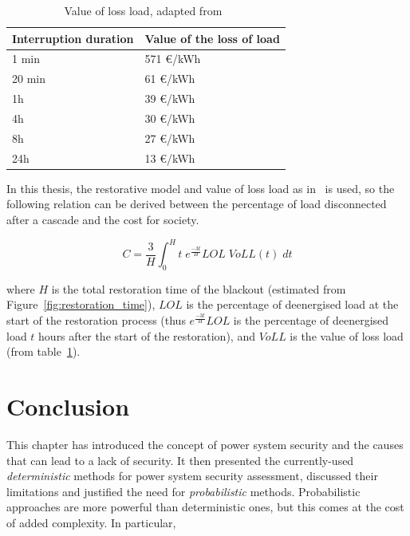 \begin{table}
    \centering
    \caption{Value of loss load, adapted from~\cite{VOLL}}
    \label{tab:VOLL}
    \begin{tabular}{@{}ll@{}}
    \toprule
    Interruption duration & Value of the loss of load \\ \midrule
    1 min  & 571 €/kWh \\
    20 min & 61 €/kWh \\
    1h     & 39 €/kWh \\
    4h     & 30 €/kWh \\
    8h     & 27 €/kWh \\
    24h    & 13 €/kWh \\ \bottomrule
    \end{tabular}
\end{table}

In this thesis, the restorative model and value of loss load as in~\cite{PierreIEEEtran} is used, so the following relation can be derived between the percentage of load disconnected after a cascade and the cost for society.

\begin{equation}
    \label{eq:VOLL}
    C = \frac{3}{H} \int_0^H t \; e^{\frac{-3t}{H}} LOL \; VoLL(t) \; dt
\end{equation}

\noindent where \(H\) is the total restoration time of the blackout (estimated from Figure~\ref{fig:restoration_time}), \(LOL\) is the percentage of deenergised load at the start of the restoration process (thus \(e^{\frac{-3t}{H}} LOL\) is the percentage of deenergised load \(t\) hours after the start of the restoration), and \(VoLL\) is the value of loss load (from table~\ref{tab:VOLL}).


\section{Conclusion}
\label{sec:security-conclusions}

This chapter has introduced the concept of power system security and the causes that can lead to a lack of security. It then presented the currently-used \emph{deterministic} methods for power system security assessment, discussed their limitations and justified the need for \emph{probabilistic} methods. Probabilistic approaches are more powerful than deterministic ones, but this comes at the cost of added complexity. In particular,

